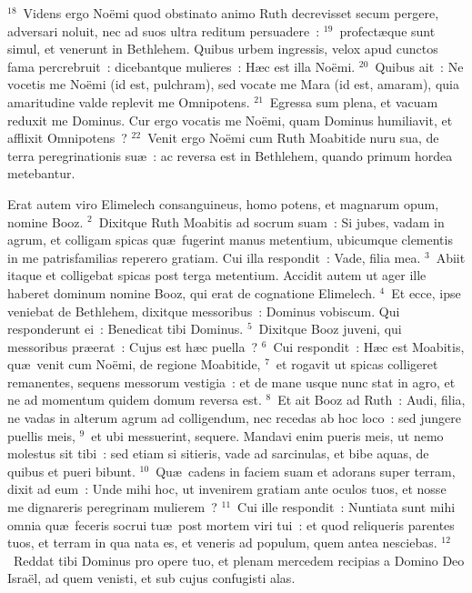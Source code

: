 ${}^{18}$~Videns ergo No\"emi quod obstinato animo Ruth decrevisset secum pergere, adversari noluit, nec ad suos ultra reditum persuadere~:
${}^{19}$~profect\ae que sunt simul, et venerunt in Bethlehem. Quibus urbem ingressis, velox apud cunctos fama percrebruit~: dicebantque mulieres~: H\ae c est illa No\"emi.
${}^{20}$~Quibus ait~: Ne vocetis me No\"emi (id est, pulchram), sed vocate me Mara (id est, amaram), quia amaritudine valde replevit me Omnipotens.
${}^{21}$~Egressa sum plena, et vacuam reduxit me Dominus. Cur ergo vocatis me No\"emi, quam Dominus humiliavit, et afflixit Omnipotens~?
${}^{22}$~Venit ergo No\"emi cum Ruth Moabitide nuru sua, de terra peregrinationis su\ae~: ac reversa est in Bethlehem, quando primum hordea metebantur.

\lettrine[lines=3,image=true,loversize=0.05,lraise=-0.03]{E}{}rat autem viro Elimelech consanguineus, homo potens, et magnarum opum, nomine Booz.
${}^{2}$~Dixitque Ruth Moabitis ad socrum suam~: Si jubes, vadam in agrum, et colligam spicas qu\ae\ fugerint manus metentium, ubicumque clementis in me patrisfamilias reperero gratiam. Cui illa respondit~: Vade, filia mea.
${}^{3}$~Abiit itaque et colligebat spicas post terga metentium. Accidit autem ut ager ille haberet dominum nomine Booz, qui erat de cognatione Elimelech.
${}^{4}$~Et ecce, ipse veniebat de Bethlehem, dixitque messoribus~: Dominus vobiscum. Qui responderunt ei~: Benedicat tibi Dominus.
${}^{5}$~Dixitque Booz juveni, qui messoribus pr\ae erat~: Cujus est h\ae c puella~?
${}^{6}$~Cui respondit~: H\ae c est Moabitis, qu\ae\ venit cum No\"emi, de regione Moabitide,
${}^{7}$~et rogavit ut spicas colligeret remanentes, sequens messorum vestigia~: et de mane usque nunc stat in agro, et ne ad momentum quidem domum reversa est.
${}^{8}$~Et ait Booz ad Ruth~: Audi, filia, ne vadas in alterum agrum ad colligendum, nec recedas ab hoc loco~: sed jungere puellis meis,
${}^{9}$~et ubi messuerint, sequere. Mandavi enim pueris meis, ut nemo molestus sit tibi~: sed etiam si sitieris, vade ad sarcinulas, et bibe aquas, de quibus et pueri bibunt.
${}^{10}$~Qu\ae\ cadens in faciem suam et adorans super terram, dixit ad eum~: Unde mihi hoc, ut invenirem gratiam ante oculos tuos, et nosse me dignareris peregrinam mulierem~?
${}^{11}$~Cui ille respondit~: Nuntiata sunt mihi omnia qu\ae\ feceris socrui tu\ae\ post mortem viri tui~: et quod reliqueris parentes tuos, et terram in qua nata es, et veneris ad populum, quem antea nesciebas.
${}^{12}$~Reddat tibi Dominus pro opere tuo, et plenam mercedem recipias a Domino Deo Isra\"el, ad quem venisti, et sub cujus confugisti alas.
